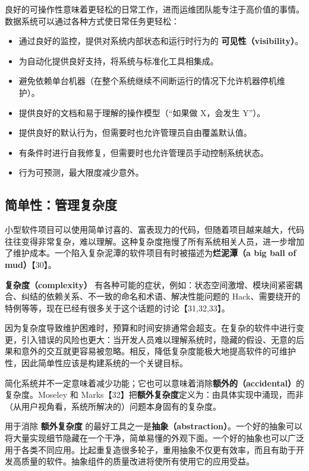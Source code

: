 良好的可操作性意味着更轻松的日常工作，进而运维团队能专注于高价值的事情。数据系统可以通过各种方式使日常任务更轻松：

\begin{itemize}
  \item 通过良好的监控，提供对系统内部状态和运行时行为的 \textbf{可见性（visibility）}。
  \item 为自动化提供良好支持，将系统与标准化工具相集成。
  \item 避免依赖单台机器（在整个系统继续不间断运行的情况下允许机器停机维护）。
  \item 提供良好的文档和易于理解的操作模型（“如果做 X，会发生 Y”）。
  \item 提供良好的默认行为，但需要时也允许管理员自由覆盖默认值。
  \item 有条件时进行自我修复，但需要时也允许管理员手动控制系统状态。
  \item 行为可预测，最大限度减少意外。
\end{itemize}

\subsection{简单性：管理复杂度}

小型软件项目可以使用简单讨喜的、富表现力的代码，但随着项目越来越大，代码往往变得非常复杂，难以理解。这种复杂度拖慢了所有系统相关人员，进一步增加了维护成本。一个陷入复杂泥潭的软件项目有时被描述为\textbf{烂泥潭（a big ball of mud）}【30】。

\textbf{复杂度（complexity）} 有各种可能的症状，例如：状态空间激增、模块间紧密耦合、纠结的依赖关系、不一致的命名和术语、解决性能问题的 Hack、需要绕开的特例等等，现在已经有很多关于这个话题的讨论【31,32,33】。

因为复杂度导致维护困难时，预算和时间安排通常会超支。在复杂的软件中进行变更，引入错误的风险也更大：当开发人员难以理解系统时，隐藏的假设、无意的后果和意外的交互就更容易被忽略。相反，降低复杂度能极大地提高软件的可维护性，因此简单性应该是构建系统的一个关键目标。

简化系统并不一定意味着减少功能；它也可以意味着消除\textbf{额外的（accidental）}的复杂度。Moseley 和 Marks【32】把\textbf{额外复杂度}定义为：由具体实现中涌现，而非（从用户视角看，系统所解决的）问题本身固有的复杂度。

用于消除 \textbf{额外复杂度} 的最好工具之一是\textbf{抽象（abstraction）}。一个好的抽象可以将大量实现细节隐藏在一个干净，简单易懂的外观下面。一个好的抽象也可以广泛用于各类不同应用。比起重复造很多轮子，重用抽象不仅更有效率，而且有助于开发高质量的软件。抽象组件的质量改进将使所有使用它的应用受益。

